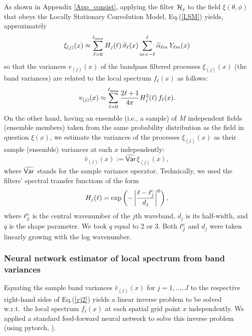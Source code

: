 \documentclass[12pt]{article}
\newcommand{\Var}{{\mathsf{Var}}\,}
\newcommand{\ie}{i.e., }
\newcommand{\wrt}{w.r.t.\ }
\begin{document}
As shown in Appendix \ref{App_consist}, applying the filter ${\cal H}_j$ to the field  $\xi(\theta, \phi)$
that  obeys the Locally Stationary Convolution Model, Eq.(\ref{LSM}) yields, approximately
%
\begin {equation}
\label{xi_j}
\xi_{(j)}(x) \approx \sum^{\ell_{\rm max}}_{\ell=0} H_j(\ell) \,\widetilde\sigma_{\ell}(x)  
   \sum^\ell_{m=-\ell} \widetilde\alpha_{\ell m}  \, Y_{\ell m} (x)
\end {equation}
%
so that the variances $v_{(j)}(x)$ of the bandpass filtered processes
$\xi_{(j)}(x)$ (the band variances)
are related to the local spectrum $f_\ell(x)$ as follows:
%
\begin {equation}
\label{vj2}
v_{(j)}(x) \approx  \sum^{\ell_{\rm max}}_{\ell=0}  \frac{2\ell +1}{4\pi}  H_j^2(\ell) \, f_\ell(x).
\end {equation}
%
On the other hand, having  an ensemble (\ie a sample) of  $M$ independent fields (ensemble members)
taken from the same probability distribution as the field in question $\xi(x)$,
we estimate the variances of the processes $\xi_{(j)}(x)$ as their sample (ensemble) variances
at each $x$ independently: 
%
\begin {equation}
\label{vj4}
\widehat v_{(j)}(x) := \widehat\Var \xi_{(j)}(x),
\end {equation}
%
where $\widehat\Var$ stands for the sample variance operator.
Technically, we used the filters' spectral transfer functions of the form
%
\begin {equation}
\label{Hj}
H_j(\ell) = \exp \left(-\left|\frac{\ell-\ell^{\rm c}_j}{d_j} \right|^q \right),
\end {equation}
%
where $\ell^{\rm c}_j$ is the central wavenumber of the $j$th waveband, ${d_j}$
is its half-width, and $q$ is the shape parameter.
We took $q$ equal to 2 or 3. Both
$\ell^{\rm c}_j$ and ${d_j}$ were taken linearly growing with the log wavenumber.




\subsubsection{Neural network estimator of local spectrum from band variances}
\label{sec_B2S_NN}



Equating the sample band variances $\widehat v_{(j)}(x)$ for $j=1,\dots,J$ to the respective right-hand sides of Eq.(\ref{vj2})
yields a linear inverse problem to be solved \wrt the local spectrum $f_\ell(x)$
at each spatial grid point $x$ independently.
We applied a standard feed-forward neural network to solve this inverse problem
(using pytorch, \citet{qq}).
\end{document}

